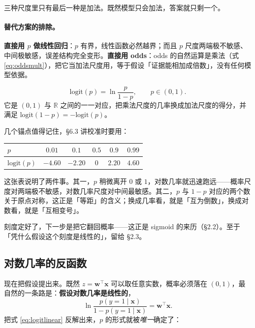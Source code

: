 \documentclass[11pt,a4paper,fontset=windows,zihao=-4]{ctexart}
\newcommand{\R}{\mathbb{R}}
\newcommand{\bw}{\mathbf{w}}
\newcommand{\bx}{\mathbf{x}}
\newcommand{\tp}{^{\top}}
\newcommand{\tabhead}{\sffamily\bfseries\color{navy}}
\begin{document}
三种尺度里只有最后一种是加法。既然模型只会加法，答案就只剩一个。

\paragraph{替代方案的排除。}\textbf{直接用 $p$ 做线性回归}：$p$ 有界，线性函数必然越界；而且 $p$ 尺度两端极不敏感、中间极敏感，误差结构完全变形。\textbf{直接用 odds}：odds 的自然运算是乘法（式 \eqref{eq:oddsmult}），把它当加法尺度用，等于假设「证据能相加成倍数」，没有任何模型依据。

\begin{dfn}[对数几率]
\begin{equation}
  \mathrm{logit}(p)=\ln\frac{p}{1-p},\qquad p\in(0,1).
  \label{eq:logit}
\end{equation}
它是 $(0,1)$ 与 $\R$ 之间的一一对应，把乘法尺度的几率换成加法尺度的得分，并满足 $\mathrm{logit}(1-p)=-\mathrm{logit}(p)$。
\end{dfn}

几个锚点值得记住，\S6.3 讲校准时要用：

\begin{center}
\small
\begin{tabular}{@{}lccccc@{}}
\toprule
\rowcolor{navy!7}
\tabhead $p$ & $0.01$ & $0.1$ & $0.5$ & $0.9$ & $0.99$\\
\midrule
$\mathrm{logit}(p)$ & $-4.60$ & $-2.20$ & $0$ & $2.20$ & $4.60$\\
\bottomrule
\end{tabular}
\end{center}

这张表说明了两件事。其一，$p$ 稍微离开 $0$ 或 $1$，对数几率就迅速跑远——概率尺度对两端极不敏感，对数几率尺度对中间最敏感。其二，$p$ 与 $1-p$ 对应的两个数关于原点对称，这正是「等距」的含义；换成几率看，就是「互为倒数」，换成对数看，就是「互相变号」。

刻度定好了，下一步是把它翻回概率——这正是 sigmoid 的来历（\S2.2）。至于「凭什么假设这个刻度是线性的」，留给 \S2.3。

\subsection{对数几率的反函数}

现在把假设提出来。既然 $z=\bw\tp\bx$ 可以取任意实数，概率必须落在 $(0,1)$，最自然的一条路是：\textbf{假设对数几率是线性的}，
\begin{equation}
  \ln\frac{p(y=1\mid\bx)}{1-p(y=1\mid\bx)}=\bw\tp\bx .
  \label{eq:logitlinear}
\end{equation}
把式 \eqref{eq:logitlinear} 反解出来，$p$ 的形式就被\emph{唯一}确定了：
\end{document}
